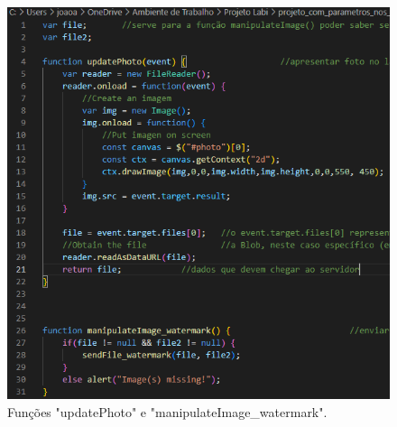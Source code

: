 \documentclass{report}
\begin{document}
    \linebreak
 \bigskip

\begin{figure}[!hbtp]
        \centering
        \includegraphics[scale=0.85]{Images_code/12 - image manipulation js watermark uploadPhoto e manipulateImage_watermark.png}
        \caption{\label{Estrutura}Funções "updatePhoto" e "manipulateImage\_watermark".}
\end{figure}




\newpage
\end{document}
